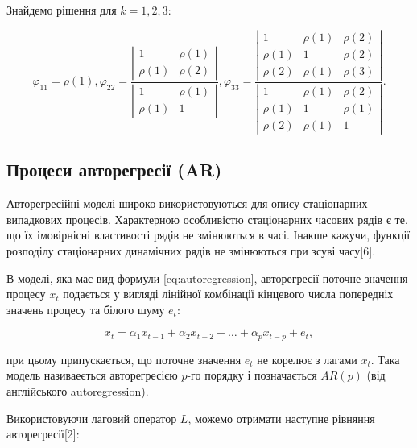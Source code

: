 Знайдемо рішення для $k = 1, 2, 3$:

\[
\varphi_{11} = \rho(1), \varphi_{22} = \frac{\left|\begin{array}{cc} 1 & \rho(1) \\ \rho(1) & \rho(2) \end{array} \right|}{\left|\begin{array}{cc} 1 & \rho(1) \\ \rho(1) & 1 \end{array}\right|},
\varphi_{33} = \frac{\left|\begin{array}{ccc} 1 & \rho(1) & \rho(2) \\ \rho(1) & 1 & \rho(2) \\ \rho(2) & \rho(1) & \rho(3) \end{array}\right|}{\left|\begin{array}{ccc} 1 & \rho(1) & \rho(2) \\ \rho(1) & 1 & \rho(1) \\ \rho(2) & \rho(1) & 1 \end{array}\right|}.
\]

\subsection{Процеси авторегресії (AR)}

Авторегресійні моделі широко використовуються для опису стаціонарних випадкових процесів. Характерною особливістю стаціонарних часових рядів є те, що їх імовірнісні властивості рядів не змінюються в часі. Інакше кажучи, функції розподілу стаціонарних динамічних рядів не змінюються при зсуві часу[6].

В моделі, яка має вид формули \ref{eq:autoregression}, авторегресії поточне значення процесу $x_{t}$ подається у вигляді лінійної комбінації кінцевого числа попередніх значень процесу та білого шуму $e_{t}$:

\begin{equation}\label{eq:autoregression}
x_{t} = \alpha_{1}x_{t-1} + \alpha_{2}x_{t-2} + \dots + \alpha_{p}x_{t-p} + e_{t},
\end{equation}

\noindent при цьому припускається, що поточне значення $e_{t}$ не корелює з лагами $x_{t}$. Така модель називаеється авторегресією $p$-го порядку і позначається $AR(p)$ (від англійського autoregression).

Використовуючи лаговий оператор $L$, можемо отримати наступне рівняння авторегресії[2]:

